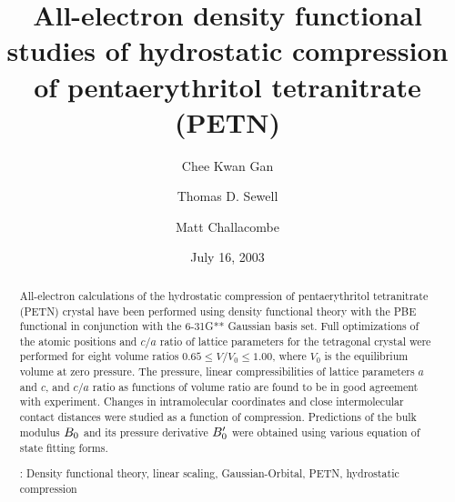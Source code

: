 \documentclass[prb,aps,nobibnotes,twocolumn,doublespace,twocolumngrid,superbib]{revtex4}
\begin{document}
\title[Short Title]{ 
All-electron density functional studies of hydrostatic compression of 
pentaerythritol tetranitrate (PETN)}
\author{Chee Kwan Gan\footnotemark[1]}
\author{Thomas D. Sewell\footnotemark[2]}
\author{Matt Challacombe\footnotemark[3]}

\date{July 16, 2003}

\begin{abstract}
All-electron calculations of the hydrostatic compression of
pentaerythritol tetranitrate (PETN) crystal have been performed using
density functional theory with the PBE functional in conjunction with
the 6-31G** Gaussian basis set.  Full optimizations of the atomic
positions and $c/a$ ratio of lattice parameters for the tetragonal
crystal were performed for eight volume ratios $0.65
\le V/V_0 \le 1.00$, where $V_0$ is the equilibrium volume at zero
pressure.  The pressure, linear compressibilities of lattice
parameters $a$ and $c$, and $c/a$ ratio as functions of volume ratio
are found to be in good agreement with experiment.  Changes in
intramolecular coordinates and close intermolecular contact distances
were studied as a function of compression.  Predictions of the bulk
modulus $B_0$ and its pressure derivative ${B'_0}$ were obtained
using various equation of state fitting forms.

\smallskip
{}: Density functional theory, linear scaling, 
Gaussian-Orbital, PETN, hydrostatic compression
\end{abstract}

\maketitle

\end{document}
